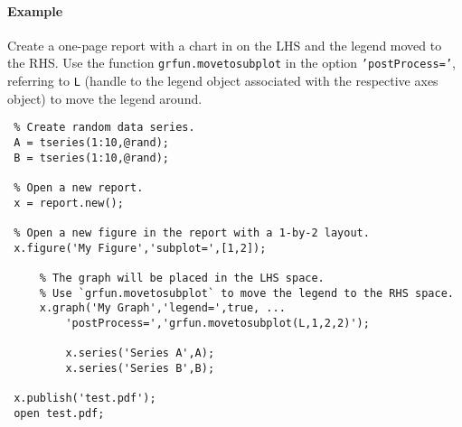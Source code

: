  \paragraph{Example}
 
 Create a one-page report with a chart in on the LHS and the legend moved
 to the RHS. Use the function \texttt{grfun.movetosubplot} in the option
 \texttt{'postProcess='}, referring to \texttt{L} (handle to the legend
 object associated with the respective axes object) to move the legend
 around.
 
 \begin{verbatim}
 % Create random data series.
 A = tseries(1:10,@rand);
 B = tseries(1:10,@rand);
 
 % Open a new report.
 x = report.new();
 
 % Open a new figure in the report with a 1-by-2 layout.
 x.figure('My Figure','subplot=',[1,2]);
 
     % The graph will be placed in the LHS space.
     % Use `grfun.movetosubplot` to move the legend to the RHS space.
     x.graph('My Graph','legend=',true, ...
         'postProcess=','grfun.movetosubplot(L,1,2,2)');
 
         x.series('Series A',A);
         x.series('Series B',B);
 
 x.publish('test.pdf');
 open test.pdf;
 \end{verbatim}



